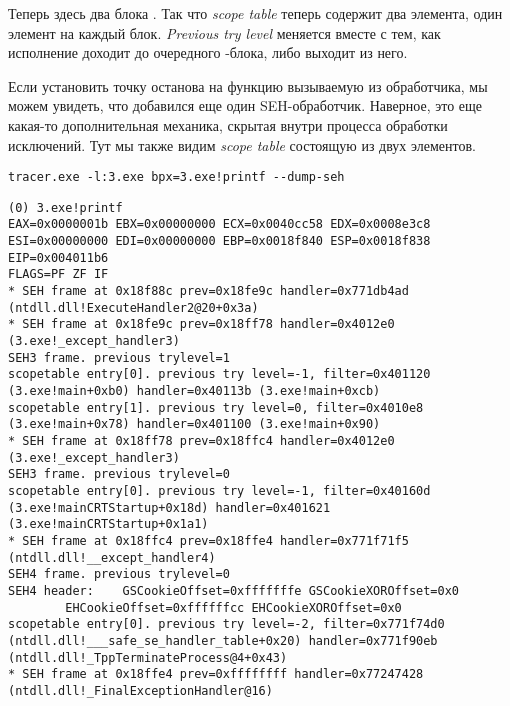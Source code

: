 

Теперь здесь два блока .
Так что \emph{scope table} теперь содержит два элемента, один элемент на каждый блок.
\emph{Previous try level} меняется вместе с тем, как исполнение доходит до очередного -блока, либо выходит из него.



Если установить точку останова на функцию \printf{} вызываемую из обработчика,
мы можем увидеть, что добавился еще один SEH-обработчик.
Наверное, это еще какая-то дополнительная механика, скрытая внутри процесса обработки исключений.
Тут мы также видим \emph{scope table} состоящую из двух элементов.

\begin{lstlisting}
tracer.exe -l:3.exe bpx=3.exe!printf --dump-seh
\end{lstlisting}

\begin{lstlisting}[caption=tracer.exe output]
(0) 3.exe!printf
EAX=0x0000001b EBX=0x00000000 ECX=0x0040cc58 EDX=0x0008e3c8
ESI=0x00000000 EDI=0x00000000 EBP=0x0018f840 ESP=0x0018f838
EIP=0x004011b6
FLAGS=PF ZF IF
* SEH frame at 0x18f88c prev=0x18fe9c handler=0x771db4ad (ntdll.dll!ExecuteHandler2@20+0x3a)
* SEH frame at 0x18fe9c prev=0x18ff78 handler=0x4012e0 (3.exe!_except_handler3)
SEH3 frame. previous trylevel=1
scopetable entry[0]. previous try level=-1, filter=0x401120 (3.exe!main+0xb0) handler=0x40113b (3.exe!main+0xcb)
scopetable entry[1]. previous try level=0, filter=0x4010e8 (3.exe!main+0x78) handler=0x401100 (3.exe!main+0x90)
* SEH frame at 0x18ff78 prev=0x18ffc4 handler=0x4012e0 (3.exe!_except_handler3)
SEH3 frame. previous trylevel=0
scopetable entry[0]. previous try level=-1, filter=0x40160d (3.exe!mainCRTStartup+0x18d) handler=0x401621 (3.exe!mainCRTStartup+0x1a1)
* SEH frame at 0x18ffc4 prev=0x18ffe4 handler=0x771f71f5 (ntdll.dll!__except_handler4)
SEH4 frame. previous trylevel=0
SEH4 header:	GSCookieOffset=0xfffffffe GSCookieXOROffset=0x0
		EHCookieOffset=0xffffffcc EHCookieXOROffset=0x0
scopetable entry[0]. previous try level=-2, filter=0x771f74d0 (ntdll.dll!___safe_se_handler_table+0x20) handler=0x771f90eb (ntdll.dll!_TppTerminateProcess@4+0x43)
* SEH frame at 0x18ffe4 prev=0xffffffff handler=0x77247428 (ntdll.dll!_FinalExceptionHandler@16)
\end{lstlisting}


